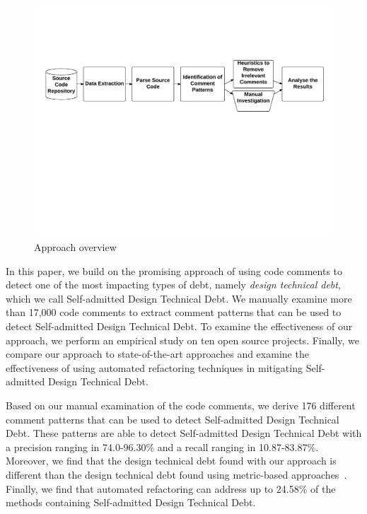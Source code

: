 \documentclass[conference]{IEEEtran}
\newcommand{\SADTD}{Self-admitted Design Technical Debt\xspace}
\begin{document}
\begin{figure}[thb!]
	\centering
	\label{fig:approach}
	\includegraphics[width=1\textwidth]{figures/Approach2}
	\vspace{-10mm}
	\caption{Approach overview}
\end{figure}


In this paper, we build on the promising approach of using code comments to detect one of the most impacting types of debt, namely \emph{design technical debt}, which we call \SADTD. We manually examine more than 17,000 code comments to extract comment patterns that can be used to detect \SADTD. To examine the effectiveness of our approach, we perform an empirical study on ten open source projects. Finally, we compare our approach to state-of-the-art approaches and examine the effectiveness of using automated refactoring techniques in mitigating \SADTD.

Based on our manual examination of the code comments, we derive 176 different comment patterns that can be used to detect \SADTD. These patterns are able to detect \SADTD with a precision ranging in 74.0-96.30\% and a recall ranging in 10.87-83.87\%. Moreover, we find that the design technical debt found with our approach is different than the design technical debt found using metric-based approaches~\cite{Zazworka2013CSE}. Finally, we find that automated refactoring can address up to 24.58\% of the methods containing \SADTD.

\end{document}
